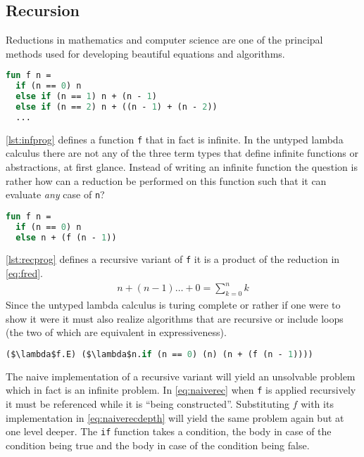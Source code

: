 \documentclass[11pt,oneside,a4paper]{report}
\begin{document}
\subsection{Recursion}
\label{sec:lamrec}
\noindent Reductions in mathematics and computer science are one of the principal methods used for developing beautiful equations and algorithms.
\begin{lstlisting}[language=ML,caption={Infinite program},label={lst:infprog}]
fun f n = 
  if (n == 0) n
  else if (n == 1) n + (n - 1)
  else if (n == 2) n + ((n - 1) + (n - 2))
  ...
\end{lstlisting}
\autoref{lst:infprog} defines a function \texttt{f} that in fact is infinite.
In the untyped lambda calculus there are not any of the three term types that define infinite functions or abstractions, at first glance.
Instead of writing an infinite function the question is rather how can a reduction be performed on this function such that it can evaluate \textit{any} case of \texttt{n}?
\begin{lstlisting}[language=ML,caption={Recursive program},label={lst:recprog}]
fun f n = 
  if (n == 0) n
  else n + (f (n - 1))
\end{lstlisting}
\autoref{lst:recprog} defines a recursive variant of \texttt{f} it is a product of the reduction in \autoref{eq:fred}.
\begin{align}
    n + (n - 1) \dots + 0 = \sum_{k = 0}^n k
    \label{eq:fred}
\end{align}
Since the untyped lambda calculus is turing complete or rather if one were to show it were it must also realize algorithms that are recursive or include loops (the two of which are equivalent in expressiveness).
\begin{lstlisting}[language=ML,caption={Recursive function},label={eq:naiverec},mathescape=true]
($\lambda$f.E) ($\lambda$n.if (n == 0) (n) (n + (f (n - 1))))
\end{lstlisting}
The naive implementation of a recursive variant will yield an unsolvable problem which in fact is an infinite problem.
In \autoref{eq:naiverec} when \texttt{f} is applied recursively it must be referenced while it is ``being constructed''.
Substituting $f$ with its implementation in \autoref{eq:naiverecdepth} will yield the same problem again but at one level deeper.
The \texttt{if} function takes a condition, the body in case of the condition being true and the body in case of the condition being false.
\end{document}
